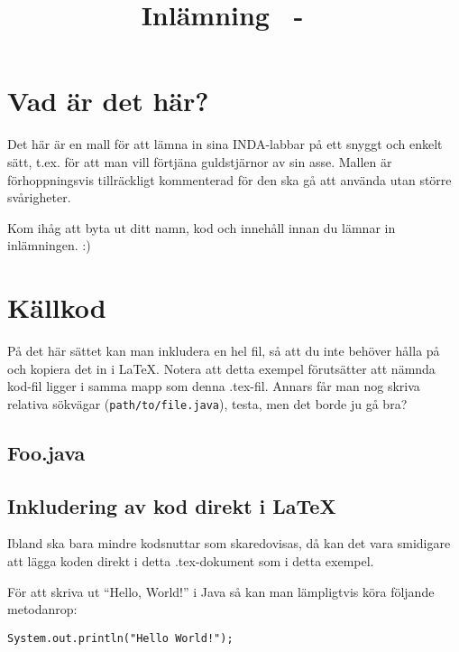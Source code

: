\documentclass[a4paper,10pt,twoside]{article}
\date{\thedate}
\author{\theauthor}
\title{Inlämning \homeworknumber\ - \course\ \coursename}
\begin{document}

\clearpage
\thispagestyle{empty}
\mbox{} %
\clearpage 

\setcounter{page}{1}

\section{Vad är det här?}

Det här är en mall för att lämna in sina INDA-labbar på ett snyggt och enkelt
sätt, t.ex. för att man vill förtjäna guldstjärnor av sin asse. Mallen är
förhoppningsvis tillräckligt kommenterad för den ska gå att använda utan större
svårigheter.

Kom ihåg att byta ut ditt namn, kod och innehåll innan du lämnar in
inlämningen. :)

\section{Källkod}

På det här sättet kan man inkludera en hel fil, så att du inte behöver hålla på
och kopiera det in i \LaTeX. Notera att detta exempel förutsätter att nämnda
kod-fil ligger i samma mapp som denna .tex-fil. Annars får man nog skriva
relativa sökvägar (\texttt{path/to/file.java}), testa, men det borde ju gå bra?

\subsection{Foo.java}

\subsection{Inkludering av kod direkt i \LaTeX}

Ibland ska bara mindre kodsnuttar som skaredovisas, då kan det vara smidigare
att lägga koden direkt i detta .tex-dokument som i detta exempel.

För att skriva ut ``Hello, World!'' i Java så kan man lämpligtvis köra följande
metodanrop:

\begin{lstlisting}
System.out.println("Hello World!");
\end{lstlisting}
\end{document}
